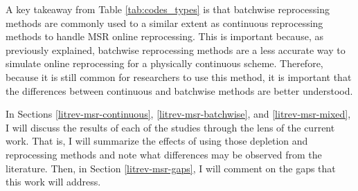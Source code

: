 A key takeaway from Table \ref{tab:codes_types} is that batchwise reprocessing methods are commonly used to a similar extent as continuous reprocessing methods to handle MSR online reprocessing.
This is important because, as previously explained, batchwise reprocessing methods are a less accurate way to simulate online reprocessing for a physically continuous scheme.
Therefore, because it is still common for researchers to use this method, it is important that the differences between continuous and batchwise methods are better understood.







In Sections \ref{litrev-msr-continuous}, \ref{litrev-msr-batchwise}, and \ref{litrev-msr-mixed}, I will discuss the results of each of the studies through the lens of the current work. That is, I will summarize the effects of using those depletion and reprocessing methods and note what differences may be observed from the literature. Then, in Section \ref{litrev-msr-gaps}, I will comment on the gaps that this work will address.

